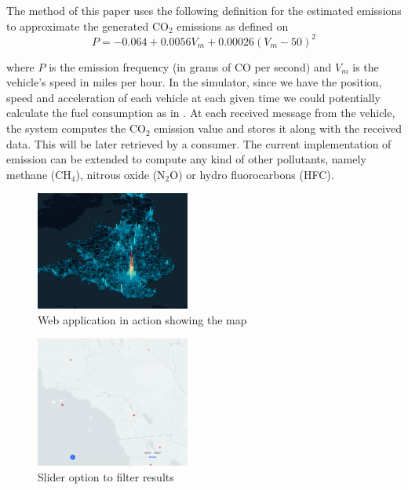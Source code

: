 \documentclass[letter, 10pt, conference]{ieeeconf}
\begin{document}
The method of this paper uses the following definition for the estimated emissions to approximate the generated CO$_2$ emissions as defined on \cite{waddell_architecture_2018}
\begin{equation}
  \label{co2_eqn}
  P=-0.064+0.0056V_{m} + 0.00026(V_{m}-50)^{2}
\end{equation}

where $P$ is the emission frequency (in grams of CO per second) and $V_m$ is the vehicle's speed in miles per hour.
In the simulator, since we have the position, speed and acceleration of each vehicle at each given time we could potentially calculate the fuel consumption as in \cite{hofer_large_2018}.
At each received message from the vehicle, the system computes the CO$_2$ emission value and stores it along with the received data.
This will be later retrieved by a consumer.
The current implementation of emission can be extended to compute any kind of other pollutants, namely methane (CH$_4$), nitrous oxide (N$_2$O) or hydro fluorocarbons (HFC).

\begin{figure}[h]
  \centering
  \includegraphics[width=0.45\textwidth]{app1}
  \caption{Web application in action showing the map}
  \label{fig:app1}
\end{figure}

\begin{figure}[h]
  \centering
  \includegraphics[width=0.45\textwidth]{app2}
  \caption{Slider option to filter results}
  \label{fig:app2}
\end{figure}
\end{document}
